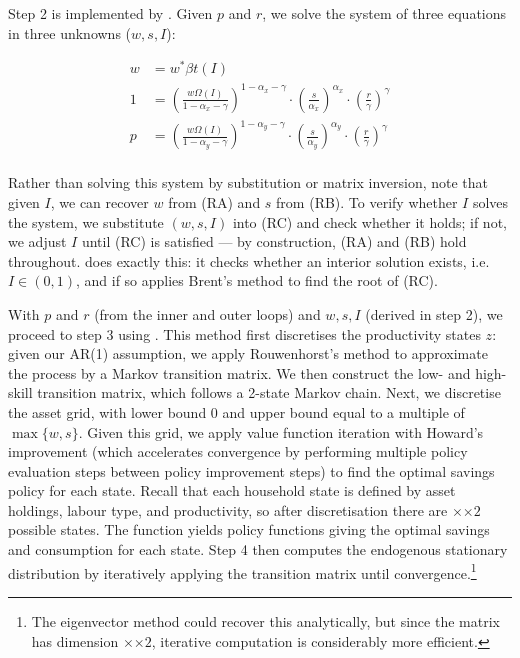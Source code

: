 \documentclass{article}
\begin{document}
Step 2 is implemented by . Given $p$ and $r$, we solve the system of three equations in three unknowns ($w,s,I$):

\vspace{-0.8cm}
\begin{align*}
 w&=w^*\beta t(I) \tag{RA} \\[4pt]
 1&=\left(\frac{w\Omega(I)}{1-\alpha_x-\gamma}\right)^{1-\alpha_x-\gamma}\cdot \left(\frac{s}{\alpha_x}\right)^{\alpha_x}\cdot \left(\frac{r}{\gamma}\right)^\gamma \tag{RB} \\[4pt]
 p&=\left(\frac{w\Omega(I)}{1-\alpha_y-\gamma}\right)^{1-\alpha_y-\gamma}\cdot \left(\frac{s}{\alpha_y}\right)^{\alpha_y}\cdot \left(\frac{r}{\gamma}\right)^\gamma \tag{RC} \\[4pt]
\end{align*}

\vspace{-0.9cm}
Rather than solving this system by substitution or matrix inversion, note that given $I$, we can recover $w$ from (RA) and $s$ from (RB). To verify whether $I$ solves the system, we substitute $(w,s,I)$ into (RC) and check whether it holds; if not, we adjust $I$ until (RC) is satisfied --- by construction, (RA) and (RB) hold throughout.  does exactly this: it checks whether an interior solution exists, i.e.\ $I\in(0,1)$, and if so applies Brent's method to find the root of (RC).

With $p$ and $r$ (from the inner and outer loops) and $w,s,I$ (derived in step 2), we proceed to step 3 using . This method first discretises the productivity states $z$: given our AR(1) assumption, we apply Rouwenhorst's method to approximate the process by a Markov transition matrix. We then construct the low- and high-skill transition matrix, which follows a 2-state Markov chain. Next, we discretise the asset grid, with lower bound 0 and upper bound equal to a multiple of $\max\{w,s\}$. Given this grid, we apply value function iteration with Howard's improvement (which accelerates convergence by performing multiple policy evaluation steps between policy improvement steps) to find the optimal savings policy for each state. Recall that each household state is defined by asset holdings, labour type, and productivity, so after discretisation there are $\times$$\times 2$ possible states. The function  yields policy functions giving the optimal savings and consumption for each state. Step 4 then computes the endogenous stationary distribution by iteratively applying the transition matrix until convergence.\footnote{The eigenvector method could recover this analytically, but since the matrix has dimension $\times$$\times 2$, iterative computation is considerably more efficient.}
\end{document}
